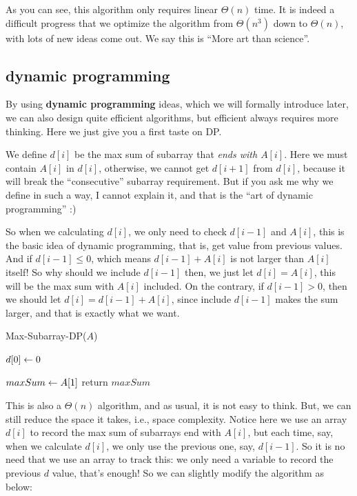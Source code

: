 \begin{spacing}{1.3}
    As you can see, this algorithm only requires linear $\Theta(n)$ time.
    It is indeed a difficult progress that we optimize the algorithm 
    from $\Theta(n^3)$ down to $\Theta(n)$, with lots of new ideas 
    come out. We say this is ``More art than science''.

    \subsection{dynamic programming}

    By using {\bf dynamic programming} ideas, which we will formally 
    introduce later, we can also design quite efficient algorithms,
    but efficient always requires more thinking.
    Here we just give you a first taste on DP.

    We define $d[i]$ be the max sum of subarray that {\it 
    ends with $A[i]$}. Here we must contain $A[i]$ in 
    $d[i]$, otherwise, we cannot get $d[i+1]$ from $d[i]$,
    because it will break the ``consecutive'' subarray requirement.
    But if you ask me why we define in such a way, I cannot 
    explain it, and that is the ``art of dynamic programming'' :)

    So when we calculating $d[i]$, we only need to check $d[i-1]$
    and $A[i]$, this is the basic idea of dynamic programming, 
    that is, get value from previous values.
    And if $d[i-1]\le 0$, which means $d[i-1]+A[i]$ is not larger than 
    $A[i]$ itself! So why should we include $d[i-1]$ then, 
    we just let $d[i]=A[i]$, this will be the max sum with 
    $A[i]$ included.
    On the contrary, if $d[i-1]>0$, then we should let 
    $d[i]=d[i-1]+A[i]$, since include $d[i-1]$ makes the sum 
    larger, and that is exactly what we want.

    \newpage
    \begin{algorithm}[H]
        \caption{Max-Subarray-DP($A$)}
        $d[0]\leftarrow 0$ \qquad {}

        $maxSum\leftarrow A[1]$\qquad {}
        return $maxSum$
    \end{algorithm}

    This is also a $\Theta(n)$ algorithm, and as usual, it is not easy 
    to think. But, we can still reduce the space it takes, i.e., 
    space complexity. Notice here we use an array $d[i]$ to record 
    the max sum of subarrays end with $A[i]$, but each time, 
    say, when we calculate $d[i]$, we only use the previous one,
    say, $d[i-1]$. So it is no need that we use an array to track this:
    we only need a variable to record the previous $d$ value,
    that's enough! So we can slightly modify the algorithm as below:


\end{spacing}
